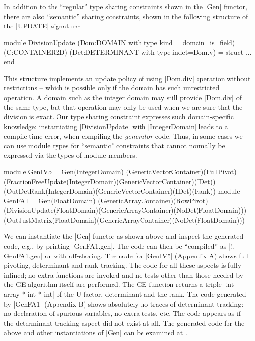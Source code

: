 \documentclass{llncs}
\begin{document}
In addition to the ``regular'' type sharing constraints shown in the
|Gen| functor, there are also ``semantic'' sharing constraints, shown
in the following structure of the |UPDATE| signature:
\vspace*{-5pt}\begin{code}
module DivisionUpdate
  (Dom:DOMAIN with type kind = domain_is_field)
  (C:CONTAINER2D)
  (Det:DETERMINANT with type indet=Dom.v) = struct ... end
\end{code}
\vspace*{-4pt} 
This structure implements an update policy of using
|Dom.div| operation without restrictions -- which is possible only if
the domain has such unrestricted operation. A domain such as the integer domain
may still provide |Dom.div| of the same type, but that operation may
only be used when we are sure that the division is exact. Our type
sharing constraint expresses such domain-specific knowledge:
instantiating |DivisionUpdate| with |IntegerDomain| leads to a
compile-time error, when compiling the \emph{generator} code. Thus, in
some cases we can use module types for ``semantic'' constraints
that cannot normally be expressed via the types of module members.
\vspace*{-5pt}
\begin{code}
module GenIV5 = Gen(IntegerDomain)
   (GenericVectorContainer)(FullPivot)
   (FractionFreeUpdate(IntegerDomain)(GenericVectorContainer)(IDet))
   (OutDetRank(IntegerDomain)(GenericVectorContainer)(IDet)(Rank))
module GenFA1 = Gen(FloatDomain)
   (GenericArrayContainer)(RowPivot)
   (DivisionUpdate(FloatDomain)(GenericArrayContainer)(NoDet(FloatDomain)))
   (OutJustMatrix(FloatDomain)(GenericArrayContainer)(NoDet(FloatDomain)))
\end{code}
\vspace*{-5pt}
We can instantiate the |Gen| functor as shown above and inspect the generated
code, e.g., by printing |GenFA1.gen|. The code can then be ``compiled'' as 
|!. GenFA1.gen| or with off-shoring. The code for |GenIV5| (Appendix A) shows
full pivoting, determinant and rank tracking. The code for all these aspects is
fully inlined; no extra functions are invoked and no tests other than those
needed by the GE algorithm itself are performed. The GE function returns a
triple |int array * int * int| of the U-factor, determinant and the rank. The
code generated by |GenFA1| (Appendix B) shows absolutely no traces of
determinant tracking: no declaration of spurious variables, no extra tests,
etc. The code appears as if the determinant tracking aspect did not exist
at all. The generated code for the above and other instantiations of
|Gen| can be examined at \cite{metamonadsURL}.
\end{document}
